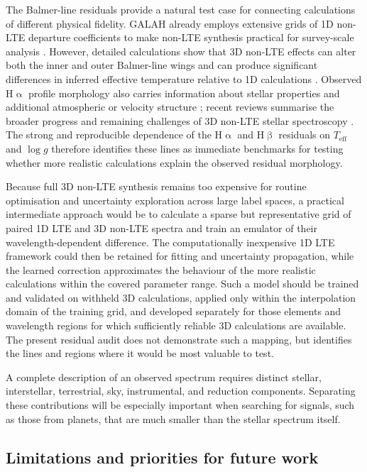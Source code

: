 \documentclass[twocolumn,apj,numberedappendix,appendixfloats]{openjournal}
\begin{document}
The Balmer-line residuals provide a natural test case for connecting calculations of different physical fidelity. GALAH already employs extensive grids of 1D non-LTE departure coefficients to make non-LTE synthesis practical for survey-scale analysis \citep{Amarsi2020}. However, detailed calculations show that 3D non-LTE effects can alter both the inner and outer Balmer-line wings and can produce significant differences in inferred effective temperature relative to 1D calculations \citep{Amarsi2018}. Observed $\mathrm{H}\upalpha$ profile morphology also carries information about stellar properties and additional atmospheric or velocity structure \citep{Bergemann2016,Sayeed2024}; recent reviews summarise the broader progress and remaining challenges of 3D non-LTE stellar spectroscopy \citep{Lind2024,Bergemann2026}. The strong and reproducible dependence of the $\mathrm{H}\upalpha$ and $\mathrm{H}\upbeta$ residuals on $T_\mathrm{eff}$ and $\log g$ therefore identifies these lines as immediate benchmarks for testing whether more realistic calculations explain the observed residual morphology.

Because full 3D non-LTE synthesis remains too expensive for routine optimisation and uncertainty exploration across large label spaces, a practical intermediate approach would be to calculate a sparse but representative grid of paired 1D LTE and 3D non-LTE spectra and train an emulator of their wavelength-dependent difference. The computationally inexpensive 1D LTE framework could then be retained for fitting and uncertainty propagation, while the learned correction approximates the behaviour of the more realistic calculations within the covered parameter range. Such a model should be trained and validated on withheld 3D calculations, applied only within the interpolation domain of the training grid, and developed separately for those elements and wavelength regions for which sufficiently reliable 3D calculations are available. The present residual audit does not demonstrate such a mapping, but identifies the lines and regions where it would be most valuable to test.

A complete description of an observed spectrum requires distinct stellar, interstellar, terrestrial, sky, instrumental, and reduction components. Separating these contributions will be especially important when searching for signals, such as those from planets, that are much smaller than the stellar spectrum itself.

\subsection{Limitations and priorities for future work}
\label{sec:discussion_limitations}
\end{document}
